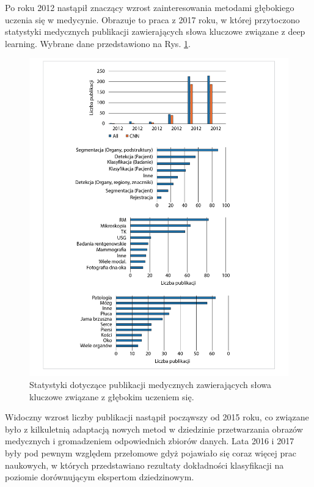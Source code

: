Po roku 2012 nastąpił znaczący wzrost zainteresowania metodami głębokiego uczenia się w medycynie. Obrazuje to praca \cite{Litjens2017} z 2017 roku, w której przytoczono statystyki medycznych publikacji zawierających słowa kluczowe związane z deep learning. Wybrane dane przedstawiono na Rys. \ref{DL_CAD_stats}.
\begin{figure}[h!]
	\centering
	\includegraphics[width=1\textwidth]{figures/DL_CAD_statystyka.jpg}
	\caption{Statystyki dotyczące publikacji medycznych zawierających słowa kluczowe związane z głębokim uczeniem się.}
	\label{DL_CAD_stats}
\end{figure}

 Widoczny wzrost liczby publikacji nastąpił począwszy od 2015 roku, co związane było z kilkuletnią adaptacją nowych metod w dziedzinie przetwarzania obrazów medycznych i gromadzeniem odpowiednich zbiorów danych. Lata 2016 i 2017 były pod pewnym względem przełomowe gdyż pojawiało się coraz więcej prac naukowych, w których przedstawiano rezultaty dokładności klasyfikacji na poziomie dorównującym ekspertom dziedzinowym.
 
